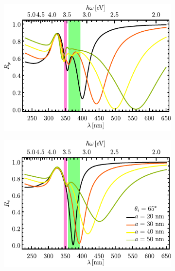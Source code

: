\begin{figure}[h!]
	\hspace*{-1.5em}
	\begin{subfigure}{.01\linewidth}\caption{}\label{sfig:R-RVar-cutp}\vspace{4.5cm}\end{subfigure}
	\begin{subfigure}{.45\linewidth}\hspace*{-1.5em}
	\includegraphics[scale=1]{2-Resultados/figs/9-AgrVar/cut_angle_65_p.pdf}\end{subfigure}
	\begin{subfigure}{.01\linewidth}\caption{}\label{sfig:R-RVar-cuts}\vspace{4.5cm}\end{subfigure}\hspace*{-1.em}
	\begin{subfigure}{.45\linewidth}\centering
	\includegraphics[scale=1 ]{2-Resultados/figs/9-AgrVar/cut_angle_65_s.pdf}\end{subfigure}\vspace*{-.7em}

\end{figure}
